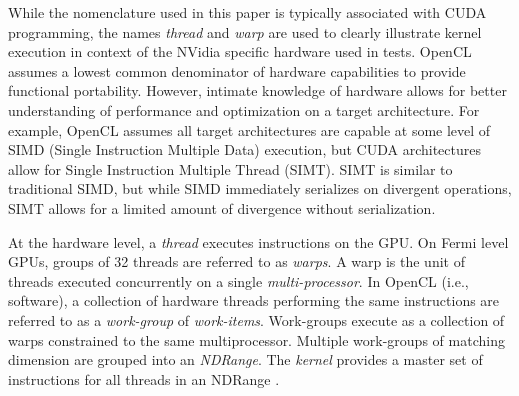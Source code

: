 \documentclass{report}
\begin{document}

While the nomenclature used in this paper is typically associated with CUDA programming, the names \textit{thread} and \textit{warp} are used to clearly illustrate kernel execution in context of the NVidia specific hardware used in tests. OpenCL assumes a lowest common denominator of hardware capabilities to provide functional portability. However, intimate knowledge of hardware allows for better understanding of performance and optimization on a target architecture. For example, OpenCL assumes all target architectures are capable at some level of SIMD (Single Instruction Multiple Data) execution, but CUDA architectures allow for Single Instruction Multiple Thread (SIMT). SIMT is similar to traditional SIMD, but while SIMD immediately serializes on divergent operations, SIMT allows for a limited amount of divergence without serialization. 

At the hardware level, a \textit{thread} executes instructions on the GPU. On Fermi level GPUs, groups of 32 threads are referred to as \textit{warps}. A warp is the unit of threads executed concurrently on a single \textit{multi-processor}. 
In OpenCL (i.e., software), a collection of hardware threads performing the same instructions are referred to as a \textit{work-group} of \textit{work-items}. Work-groups execute as a collection of warps constrained to the same multiprocessor. Multiple work-groups of matching dimension are grouped into an \textit{NDRange}. The \textit{kernel} provides a master set of instructions
for all threads in an NDRange \cite{OpenCL2009}. 

\end{document}
